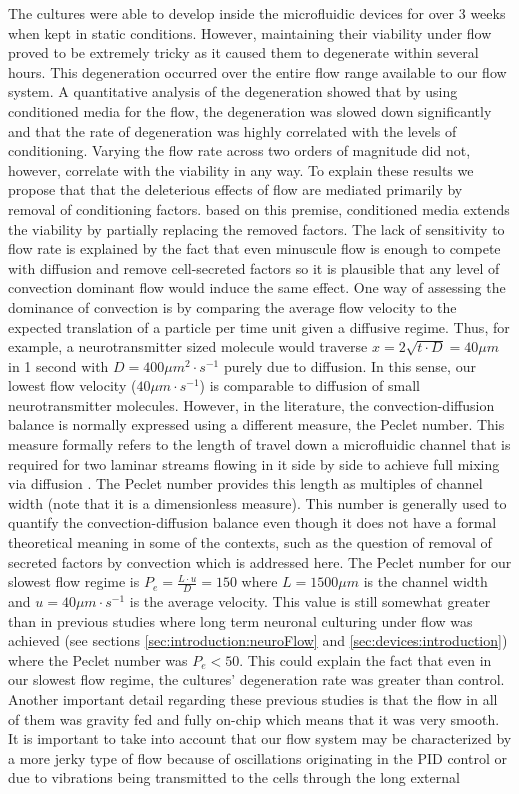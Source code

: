 The cultures were able to develop inside the microfluidic devices for over 3 weeks when kept in static conditions. However, maintaining their viability under flow proved to be extremely tricky as it caused them to degenerate within several hours. This degeneration occurred over the entire flow range available to our flow system. A quantitative analysis of the degeneration showed that by using conditioned media for the flow, the degeneration was slowed down significantly and that the rate of degeneration was highly correlated with the levels of conditioning. Varying the flow rate across two orders of magnitude did not, however, correlate with the viability in any way. To explain these results we propose that that the deleterious effects of flow are mediated primarily by removal of conditioning factors. based on this premise, conditioned media extends the viability by partially replacing the removed factors. The lack of sensitivity to flow rate is explained by the fact that even minuscule flow is enough to compete with diffusion and remove cell-secreted factors so it is plausible that any level of convection dominant flow would induce the same effect. One way of assessing the dominance of convection is by comparing the average flow velocity to the expected translation of a particle per time unit given a diffusive regime. Thus, for example, a neurotransmitter sized molecule would traverse \(x=2\sqrt{t\cdot D}=40\mu m\) in 1 second with \(D=400 \mu m^{2}\cdot s^{-1}\) \cite{johnstoneThesis} purely due to diffusion. In this sense, our lowest flow velocity (\(40 \mu m\cdot s^{-1}\)) is comparable to diffusion of small neurotransmitter molecules. However, in the literature, the convection-diffusion balance is normally expressed using a different measure, the Peclet number. This measure formally refers to the length of travel down a microfluidic channel that is required for two laminar streams flowing in it side by side to achieve full mixing via diffusion \cite{squires2005microfluidics}. The Peclet number provides this length as multiples of channel width (note that it is a dimensionless measure). This number is generally used to quantify the convection-diffusion balance even though it does not have a formal theoretical meaning in some of the contexts, such as the question of removal of secreted factors by convection which is addressed here. The Peclet number for our slowest flow regime is \(P_{e}=\frac{L\cdot u}{D}=150\) where \(L=1500\mu m\) is the channel width and \(u=40 \mu m\cdot s^{-1}\) is the average velocity. This value is still somewhat greater than in previous studies where long term neuronal culturing under flow was achieved (see sections \ref{sec:introduction:neuroFlow} and \ref{sec:devices:introduction}) where the Peclet number was \(P_{e}<50\). This could explain the fact that even in our slowest flow regime, the cultures' degeneration rate was greater than control. Another important detail regarding these previous studies is that the flow in all of them was gravity fed and fully on-chip which means that it was very smooth. It is important to take into account that our flow system may be characterized by a more jerky type of flow because of oscillations originating in the PID control or due to vibrations being transmitted to the cells through the long external 